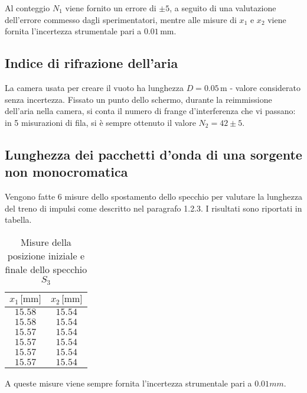 \documentclass[]{article}
\let\oldsubsection\subsection%
\renewcommand{\subsection}{%
	\renewcommand{\theequation}{\thesubsection.\arabic{equation}}%
	\oldsubsection}%
\begin{document}
Al conteggio $N_1$ viene fornito un errore di $ \pm 5$, a seguito di una valutazione dell'errore commesso dagli sperimentatori, mentre alle misure di $x_1$ e $x_2$ viene fornita l'incertezza strumentale pari a $0.01 \, \text{mm}$.


\subsection{Indice di rifrazione dell'aria}
\label{par:n_a}

La camera usata per creare il vuoto ha lunghezza $D=0.05 \, \text{m}$ - valore considerato senza incertezza. Fissato un punto dello schermo, durante la reimmissione dell'aria nella camera, si conta il numero di frange d'interferenza che vi passano: in 5 misurazioni di fila, si è sempre ottenuto il valore $N_2 = 42 \pm 5$.

\subsection{Lunghezza dei pacchetti d'onda di una sorgente non monocromatica}

Vengono fatte 6 misure dello spostamento dello specchio per valutare la lunghezza del treno di impulsi come descritto nel paragrafo 1.2.3. I risultati sono riportati in tabella.

\begin{table}[H]
    \centering

    \begin{tabular}{||c|c||}
        \hline
        $x_1 \, \text{[mm]}$ & $x_2\, \text{[mm]}$ \\
        \hline\hline

        $15.58$ & $15.54$ \\\hline
        $15.58$ & $15.54$ \\\hline
        $15.57$ & $15.54$ \\\hline
        $15.57$ & $15.54$ \\\hline
        $15.57$ & $15.54$ \\\hline
        $15.57$ & $15.54$ \\\hline
    
    \end{tabular}
    \caption{Misure della posizione iniziale e finale dello specchio $S_3$}
    \label{L}    
\end{table}

A queste misure viene sempre fornita l'incertezza strumentale pari a $0.01mm$.
\end{document}
